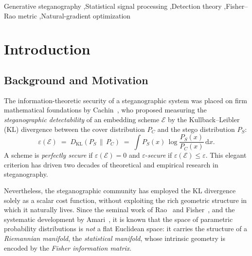 \documentclass[a4paper,fleqn]{cas-dc}
\newcommand{\DKL}{D_{\mathrm{KL}}}
\begin{document}
\begin{keywords}
Generative steganography \sep Statistical signal processing \sep Detection theory \sep Fisher--Rao metric \sep Natural-gradient optimization
\end{keywords}

\maketitle


\section{Introduction}
\label{sec:intro}

\subsection{Background and Motivation}

The information-theoretic security of a steganographic system was placed on
firm mathematical foundations by Cachin~\cite{cachin1998information}, who
proposed measuring the \emph{steganographic detectability} of an embedding
scheme $\mathcal{E}$ by the Kullback--Leibler (KL) divergence between the
cover distribution $P_C$ and the stego distribution $P_S$:
\begin{equation}
  \varepsilon(\mathcal{E}) \;=\; \DKL\!\left(P_S \,\|\, P_C\right)
  \;=\; \int P_S(x)\,\log\frac{P_S(x)}{P_C(x)}\,\mathrm{d}x.
  \label{eq:cachin_security}
\end{equation}
A scheme is \emph{perfectly secure} if $\varepsilon(\mathcal{E})=0$ and
$\varepsilon$-\emph{secure} if $\varepsilon(\mathcal{E})\leq\varepsilon$.
This elegant criterion has driven two decades of theoretical and empirical
research in steganography.

Nevertheless, the steganographic community has employed the KL divergence
solely as a scalar cost function, without exploiting the rich geometric
structure in which it naturally lives.
Since the seminal work of Rao~\cite{rao1945information} and
Fisher~\cite{fisher1925theory}, and the systematic development by
Amari~\cite{amari1985differential,amari2000methods}, it is known that
the space of parametric probability distributions is
\emph{not} a flat Euclidean space: it carries the structure of a
\emph{Riemannian manifold}, the \emph{statistical manifold}, whose intrinsic
geometry is encoded by the \emph{Fisher information matrix}.
\end{document}
